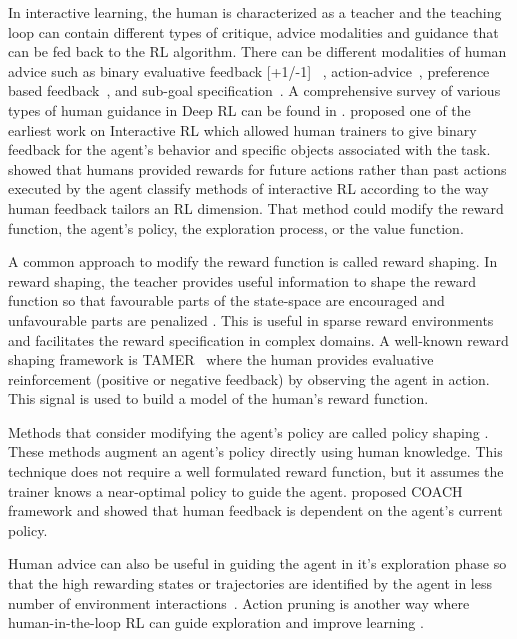 \documentclass[twoside,11pt]{article}
\begin{document}
\begin{enumerate}
In interactive learning, the human is characterized as a teacher and the teaching loop can contain different types of critique, advice modalities and guidance that can be fed back to the RL algorithm. There can be different modalities of human advice such as binary evaluative feedback [+1/-1] ~\citep{Knox:2008:TAMER}, action-advice~\citep{torrey2013teaching}, preference based feedback~\citep{Christiano:2017:DeepRLHumanPreferences,LeeSmithAbbeel:2021:FeedbackPreferenceHITLLearningPEBBLE}, and sub-goal specification~\citep{le2018hierarchical}. A comprehensive survey of various types of human guidance in Deep RL can be found in \citet{zhang2019leveraging}. \citet{Thomaz:2006:RLWithHumanTeachers} proposed one of the earliest work on Interactive RL which allowed human trainers to give binary feedback for the agent's behavior and specific objects associated with the task. \citet{Arzate:2020:SurveyInteractiveRL} showed that humans provided rewards for future actions rather than past actions executed by the agent  classify methods of interactive RL according to the way human feedback tailors an RL dimension. That method could modify the reward function, the agent's policy, the exploration process, or the value function.  

A common approach to modify the reward function is called reward shaping. In reward shaping, the teacher provides useful information to shape the reward function so that favourable parts of the state-space are encouraged and unfavourable parts are penalized \citep{ng:99}. This is useful in sparse reward environments and facilitates the reward specification in complex domains. A well-known reward shaping framework is TAMER~\citep{Knox:2008:TAMER, knox:13} where the human provides evaluative reinforcement (positive or negative feedback) by observing the agent in action. This signal is used to build a model of the human's reward function. 

Methods that consider modifying the agent's policy are called policy shaping \citep{cederborg2015policy,griffith2013policy,WuEtAl:2021:HITLDRLAutonomousDriving}. These methods augment an agent's policy directly using human knowledge. This technique does not require a well formulated reward function, but it assumes the trainer knows a near-optimal policy to guide the agent. \citet{macglashan2017interactive} proposed COACH framework and showed that human feedback is dependent on the agent’s current policy. 

Human advice can also be useful in guiding the agent in it’s exploration phase so that the high rewarding states or trajectories are identified by the agent in less number of environment interactions~\citep{amir2016interactive}. Action pruning is another way where human-in-the-loop RL can guide exploration and improve learning \citep{Abel:2017:AgentAgnosticHumanInTheLoopRL}.


\end{enumerate}
\end{document}
